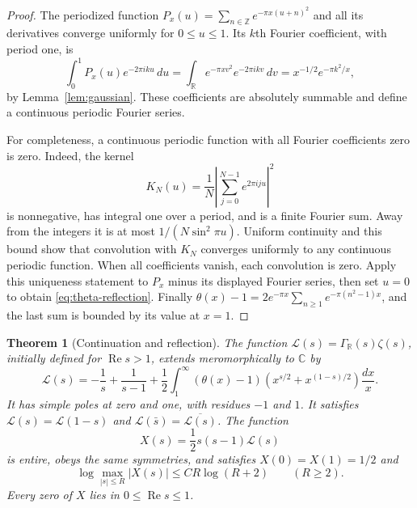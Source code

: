 \documentclass[11pt]{article}
\newtheorem{theorem}{Theorem}[section]
\theoremstyle{definition}
\theoremstyle{remark}
\numberwithin{equation}{section}
\newcommand{\R}{\mathbb R}
\newcommand{\C}{\mathbb C}
\newcommand{\Z}{\mathbb Z}
\begin{document}
\begin{proof}
The periodized function
$P_x(u)=\sum_{n\in\Z}e^{-\pi x(u+n)^2}$ and all its derivatives converge
uniformly for $0\leq u\leq1$.
Its $k$th Fourier coefficient, with period one, is
\[
 \int_0^1P_x(u)e^{-2\pi iku}\,du
 =\int_{\R}e^{-\pi xv^2}e^{-2\pi ikv}\,dv
 =x^{-1/2}e^{-\pi k^2/x},
\]
by Lemma~\ref{lem:gaussian}.
These coefficients are absolutely summable and define a continuous
periodic Fourier series.

For completeness, a continuous periodic function with all Fourier
coefficients zero is zero.  Indeed, the kernel
\[
 K_N(u)=\frac1N\left|\sum_{j=0}^{N-1}e^{2\pi iju}\right|^2
\]
is nonnegative, has integral one over a period, and is a finite Fourier sum.
Away from the integers it is at most $1/(N\sin^2\pi u)$.
Uniform continuity and this bound show that convolution with $K_N$ converges
uniformly to any continuous periodic function.
When all coefficients vanish, each convolution is zero.
Apply this uniqueness statement to $P_x$ minus its displayed Fourier series,
then set $u=0$ to obtain \eqref{eq:theta-reflection}.
Finally
$\theta(x)-1=2e^{-\pi x}\sum_{n\geq1}e^{-\pi(n^2-1)x}$,
and the last sum is bounded by its value at $x=1$.
\end{proof}

\begin{theorem}[Continuation and reflection]
\label{thm:completion}
The function $\mathcal L(s)=\Gamma_{\R}(s)\zeta(s)$, initially defined for
$\operatorname{Re}s>1$, extends meromorphically to $\C$ by
\begin{equation}
 \mathcal L(s)=-\frac1s+\frac1{s-1}
   +\frac12\int_1^\infty(\theta(x)-1)
                   \left(x^{s/2}+x^{(1-s)/2}\right)\frac{dx}{x}.
 \label{eq:theta-mellin}
\end{equation}
It has simple poles at zero and one, with residues $-1$ and $1$.
It satisfies $\mathcal L(s)=\mathcal L(1-s)$ and
$\mathcal L(\bar s)=\overline{\mathcal L(s)}$.
The function
\begin{equation}
 X(s)=\frac12 s(s-1)\mathcal L(s)
 \label{eq:entire-completion}
\end{equation}
is entire, obeys the same symmetries, and satisfies
$X(0)=X(1)=1/2$ and
\begin{equation}
 \log\max_{|s|\leq R}|X(s)|\leq C R\log(R+2)\qquad(R\geq2).
 \label{eq:entire-growth}
\end{equation}
Every zero of $X$ lies in $0\leq\operatorname{Re}s\leq1$.
\end{theorem}
\end{document}

